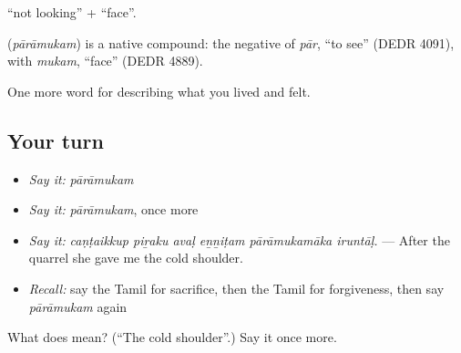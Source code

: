  \textquotedblleft{}not looking\textquotedblright{} +  \textquotedblleft{}face\textquotedblright{}.

\begin{cousinweb}
\textbf{} (\emph{pārāmukam}) is a native compound: the negative of  \emph{pār}, \textquotedblleft{}to see\textquotedblright{} (DEDR 4091), with  \emph{mukam}, \textquotedblleft{}face\textquotedblright{} (DEDR 4889).
\end{cousinweb}

\begin{grammarlens}[title={What you've built}]
One more word for describing what you lived and felt.
\end{grammarlens}

\subsection*{Your turn}
\begin{itemize}
\raggedright
  \item \emph{Say it:} \emph{pārāmukam}
  \item \emph{Say it:} \emph{pārāmukam}, once more
  \item \emph{Say it:} \emph{caṇṭaikkup piṟaku avaḷ eṉṉiṭam pārāmukamāka iruntāḷ.} — After the quarrel she gave me the cold shoulder.
  \item \emph{Recall:} say the Tamil for sacrifice, then the Tamil for forgiveness, then say \emph{pārāmukam} again
\end{itemize}

\begin{tcolorbox}[breakable,colback=teal!4,colframe=teal!35!black,title={Before you move on}]
What does  mean? (\textquotedblleft{}The cold shoulder\textquotedblright{}.) Say it once more.
\end{tcolorbox}
